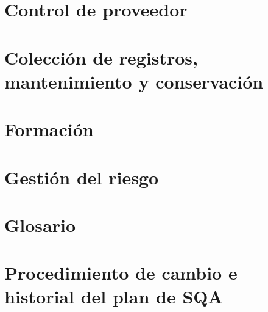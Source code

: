 \documentclass[11pt, a4paper, twoside, titlepage]{article}
\begin{document}
	\section{Control de proveedor}
	\section{Colección de registros, mantenimiento y conservación}
	\section{Formación}
	\section{Gestión del riesgo}
	\section{Glosario}
		\printglossaries
	\section{Procedimiento de cambio e historial del plan de SQA}


	\newpage
	
	
\end{document}
